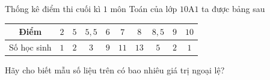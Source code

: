 \begin{bt}%
	Thống kê điểm thi cuối kì  $1$ môn Toán của lớp $10$A$1$ ta được bảng sau
	\begin{center}
		\begin{tabular}{|c|c|c|c|c|c|c|c|c|c|}
			\hline 
			Điểm & $2$ &  $5$ & $5{,}5$ & $6$ & $7$ & $8$ & $8{,}5$ & $9$ & $10$ \\ \hline
			Số học sinh & $1$ & $2$ & $3$ & $9$ & $11$ & $13$ &  $5$ & $2$ & $1$ \\ \hline
		\end{tabular}
	\end{center}
	Hãy cho biết mẫu số  liệu trên có bao nhiêu giá trị ngoại lệ?
\end{bt}



